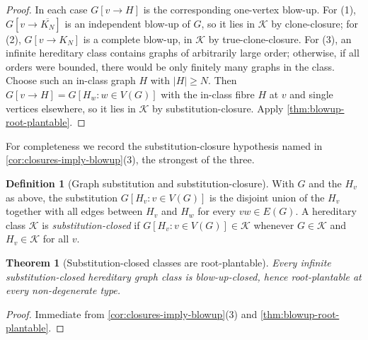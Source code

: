 \documentclass[11pt]{article}
\newtheorem{theorem}{Theorem}
\theoremstyle{definition}
\newtheorem{definition}[definition]{Definition}
\newcommand{\K}{\mathcal{K}}
\begin{document}
\begin{proof}
In each case $G[v\to H]$ is the corresponding one-vertex blow-up.  For (1),
$G[v\to\overline{K_N}]$ is an independent blow-up of $G$, so it lies in $\K$ by
clone-closure; for (2), $G[v\to K_N]$ is a complete blow-up, in $\K$ by
true-clone-closure.  For (3), an infinite hereditary class contains graphs of arbitrarily
large order; otherwise, if all orders were bounded, there would be only finitely many
graphs in the class.  Choose such an in-class graph $H$ with $|H|\ge N$.  Then
$G[v\to H]=G[H_w:w\in V(G)]$ with the in-class fibre $H$ at $v$ and single vertices
elsewhere, so it lies in $\K$ by substitution-closure.  Apply
\cref{thm:blowup-root-plantable}.
\end{proof}

For completeness we record the substitution-closure hypothesis named in
\cref{cor:closures-imply-blowup}(3), the strongest of the three.

\begin{definition}[Graph substitution and substitution-closure]\label{def:substitution-closed}
With $G$ and the $H_v$ as above, the substitution $G[H_v:v\in V(G)]$ is the disjoint union
of the $H_v$ together with all edges between $H_v$ and $H_w$ for every $vw\in E(G)$.  A
hereditary class $\K$ is \emph{substitution-closed} if $G[H_v:v\in V(G)]\in\K$ whenever
$G\in\K$ and $H_v\in\K$ for all $v$.
\end{definition}

\begin{theorem}[Substitution-closed classes are root-plantable]\label{thm:substitution-root-plantable}
Every infinite substitution-closed hereditary graph class is blow-up-closed, hence
root-plantable at every non-degenerate type.
\end{theorem}

\begin{proof}
Immediate from \cref{cor:closures-imply-blowup}(3) and
\cref{thm:blowup-root-plantable}.
\end{proof}
\end{document}
